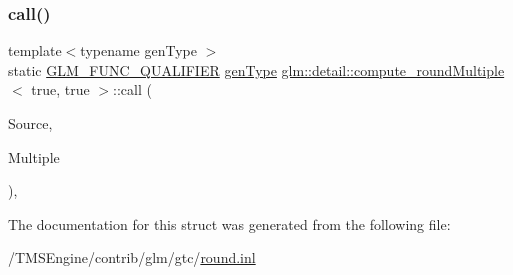 \subsubsection{\texorpdfstring{call()}{call()}}
{\footnotesize\ttfamily template$<$typename gen\+Type $>$ \\
static \hyperlink{setup_8hpp_a33fdea6f91c5f834105f7415e2a64407}{G\+L\+M\+\_\+\+F\+U\+N\+C\+\_\+\+Q\+U\+A\+L\+I\+F\+I\+ER} \hyperlink{structglm_1_1detail_1_1gen_type}{gen\+Type} \hyperlink{structglm_1_1detail_1_1compute__round_multiple}{glm\+::detail\+::compute\+\_\+round\+Multiple}$<$ true, true $>$\+::call (\begin{DoxyParamCaption}\item[{\hyperlink{structglm_1_1detail_1_1gen_type}{gen\+Type}}]{Source,  }\item[{\hyperlink{structglm_1_1detail_1_1gen_type}{gen\+Type}}]{Multiple }\end{DoxyParamCaption})\hspace{0.3cm}{\ttfamily [inline]}, {\ttfamily [static]}}



The documentation for this struct was generated from the following file\+:\begin{DoxyCompactItemize}
\item 
/\+T\+M\+S\+Engine/contrib/glm/gtc/\hyperlink{round_8inl}{round.\+inl}\end{DoxyCompactItemize}
